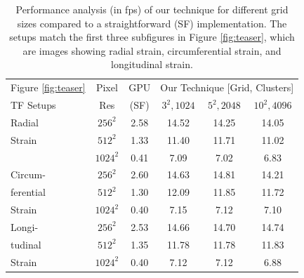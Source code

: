 \documentclass[journal]{vgtc}                %
\begin{document}
\begin{table}[b]
  \caption{Performance analysis (in fps) of our technique for different grid sizes compared to a straightforward (SF) implementation. The setups match the first three subfigures in Figure \ref{fig:teaser}, which are images showing radial strain, circumferential strain, and longitudinal strain.}
  \label{tab:performance}
  \begin{center}
    \begin{tabular}{|l|c|c|c|c|c|}
      \hline
      Figure \ref{fig:teaser} & Pixel & GPU & \multicolumn{3}{c|}{Our Technique [Grid, Clusters]}\\
      TF Setups & Res & (SF) & $3^2,1024$ & $5^2,2048$ & $10^2,4096$ \\
      \hline
      Radial & $256^2$ & 2.58 & 14.52 & 14.25 & 14.05\\
      Strain & $512^2$ & 1.33 & 11.40 & 11.71 & 11.02\\
      & $1024^2$ & 0.41 & 7.09 & 7.02 & 6.83\\
      \hline
      Circum- & $256^2$ & 2.60 & 14.63 & 14.81 & 14.21\\
      ferential & $512^2$ & 1.30 & 12.09 & 11.85 & 11.72\\
      Strain & $1024^2$ & 0.40 & 7.15 & 7.12 & 7.10\\
      \hline
      Longi- & $256^2$ & 2.53 & 14.66 & 14.70 & 14.74\\
      tudinal & $512^2$ & 1.35 & 11.78 & 11.78 & 11.83\\
      Strain & $1024^2$ & 0.40 & 7.12 & 7.12 & 6.88\\
      \hline
    \end{tabular}
  \end{center}
\end{table}
\end{document}
